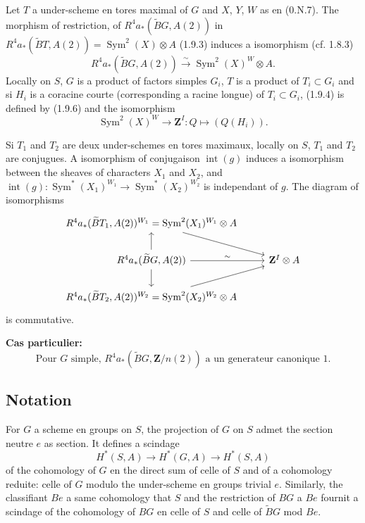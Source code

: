 \documentclass[11pt,a4paper]{article}
\theoremstyle{plain}
\theoremstyle{definition}
\DeclareMathOperator{\Sym}{Sym}
\DeclareMathOperator{\intt}{int}
\begin{document}
Let $T$ a under-scheme en tores maximal of $G$ and $X$, $Y$, $W$ as en (0.N.7). The morphism of restriction, of $R^4 a_*(\widetilde{B}G, A(2))$ in $R^4 a_*(\widetilde{B}T, A(2)) = \Sym^2(X) \otimes A$ (1.9.3) induces a isomorphism (cf. 1.8.3)
\begin{equation}\label{1.9.6}
R^4 a_*(\widetilde{B}G, A(2)) \xrightarrow{\sim} \Sym^2(X)^W \otimes A.
\end{equation}
Locally on $S$, $G$ is a product of factors simples $G_i$, $T$ is a product of $T_i \subset G_i$ and si $H_i$ is a coracine courte (corresponding a racine longue) of $T_i \subset G_i$, (1.9.4) is defined by (1.9.6) and the isomorphism
\begin{equation}\label{1.9.7}
\Sym^2(X)^W \to \mathbf{Z}^I : Q \mapsto (Q(H_i)).
\end{equation}

Si $T_1$ and $T_2$ are deux under-schemes en tores maximaux, locally on $S$, $T_1$ and $T_2$ are conjugues. A isomorphism of conjugaison $\intt(g)$ induces a isomorphism between the sheaves of characters $X_1$ and $X_2$, and $\intt(g) : \Sym^*(X_1)^{W_1} \to \Sym^*(X_2)^{W_2}$ is independant of $g$. The diagram of isomorphisms
\begin{equation}\label{1.9.8}
\begin{tikzcd}
R^4 a_*(\widetilde{B}T_1, A(2))^{W_1} = \Sym^2(X_1)^{W_1} \otimes A \arrow{dr} \\
R^4 a_*(\widetilde{B}G, A(2)) \arrow{u} \arrow{r}{\sim} \arrow{d} & \mathbf{Z}^I \otimes A \\
R^4 a_*(\widetilde{B}T_2, A(2))^{W_2} = \Sym^2(X_2)^{W_2} \otimes A \arrow{ur}
\end{tikzcd}
\end{equation}
is commutative.

\textbf{Cas particulier:}
\begin{equation}\label{1.9.9}
\text{Pour } G \text{ simple, } R^4 a_*(\widetilde{B}G, \mathbf{Z}/n(2)) \text{ a un generateur canonique } 1.
\end{equation}

\subsection{Notation}\label{1.10}

For $G$ a scheme en groups on $S$, the projection of $G$ on $S$ admet the section neutre $e$ as section. It defines a scindage
\[
H^*(S, A) \to H^*(G, A) \to H^*(S, A)
\]
of the cohomology of $G$ en the direct sum of celle of $S$ and of a cohomology reduite: celle of $G$ modulo the under-scheme en groups trivial $e$. Similarly, the classifiant $Be$ a same cohomology that $S$ and the restriction of $BG$ a $Be$ fournit a scindage of the cohomology of $BG$ en celle of $S$ and celle of $\widetilde{B}G$ mod $Be$.
\end{document}
